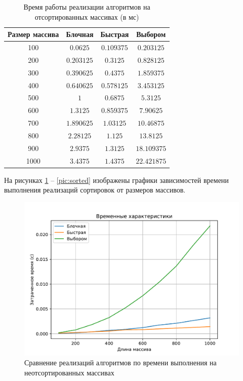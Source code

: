\begin{table}[h]
	\begin{center}
		\begin{threeparttable}
			\captionsetup{justification=raggedright,singlelinecheck=off}
			\caption{Время работы реализации алгоритмов на отсортированных массивах (в мс)}
			\label{tbl:time_measurements_rand}
			\begin{tabular}{|c|c|c|c|}
				\hline
				Размер массива & Блочная & Быстрая & Выбором \\
				\hline
				100 &$ 0.0625 $&$ 0.109375 $&$ 0.203125 $\\
				\hline
				200 &$ 0.203125 $&$ 0.3125 $&$ 0.828125 $\\
				\hline
				300 &$ 0.390625 $&$ 0.4375 $&$ 1.859375 $\\
				\hline
				400 &$ 0.640625 $&$ 0.578125 $&$ 3.453125 $\\
				\hline
				500 &$ 1 $&$ 0.6875 $&$ 5.3125 $\\
				\hline
				600 &$ 1.3125 $&$ 0.859375 $&$ 7.90625 $\\
				\hline
				700 &$ 1.890625 $&$ 1.03125 $&$ 10.46875 $\\
				\hline
				800 &$ 2.28125 $&$ 1.125 $&$ 13.8125 $\\
				\hline
				900 &$ 2.9375 $&$ 1.3125 $&$ 18.109375 $\\
				\hline
				1000 &$ 3.4375 $&$ 1.4375 $&$ 22.421875 $\\
				\hline
			\end{tabular}
		\end{threeparttable}
	\end{center}
\end{table}

\clearpage
На рисунках \ref{pic:random} -- \ref{pic:sorted} изображены графики зависимостей времени выполнения реализаций сортировок от размеров массивов.

\begin{figure}[H]
	\centering
	\includegraphics[scale=0.62]{assets/plots/cpu-random.pdf}
	\caption{Сравнение реализаций алгоритмов по времени выполнения на неотсортированных массивах}
	\label{pic:random}
\end{figure}

